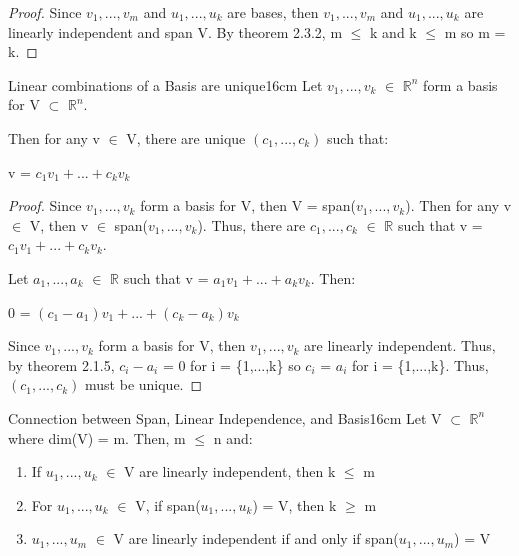     \begin{proof}
        Since $v_1,...,v_m$ and $u_1,...,u_k$ are bases,
        then $v_1,...,v_m$ and $u_1,...,u_k$ are linearly independent
        and span V.
        By {\color{red} theorem 2.3.2}, m $\leq$ k and k $\leq$ m
        so m = k.
    \end{proof}

    \vspace{0.5cm}



    \begin{wtheorem}{Linear combinations of a Basis are unique}{16cm}
        Let $v_1,...,v_k$ $\in$ $\mathbb{R}^n$ form a basis for
        V $\subset$ $\mathbb{R}^n$.
        
        Then for any v $\in$ V, there are unique $(c_1,...,c_k)$ such that:

        \hspace{0.5cm}
        v = $c_1v_1 + ... + c_kv_k$
    \end{wtheorem}

    \begin{proof}
        Since $v_1,...,v_k$ form a basis for V,
        then V = span($v_1,...,v_k$).
        Then for any v $\in$ V, then v $\in$ span($v_1,...,v_k$).
        Thus, there are $c_1,...,c_k$ $\in$ $\mathbb{R}$
        such that v = $c_1v_1 + ... + c_kv_k$.

        Let $a_1,...,a_k$ $\in$ $\mathbb{R}$ such that
        v = $a_1v_1 + ... + a_kv_k$. Then:

        \hspace{0.5cm}
        0 = $(c_1-a_1)v_1 + ... + (c_k-a_k)v_k$

        Since $v_1,...,v_k$ form a basis for V,
        then $v_1,...,v_k$ are linearly independent.
        Thus, by {\color{red} theorem 2.1.5}, $c_i - a_i$ = 0 for
        i = \{1,...,k\} so $c_i$ = $a_i$ for i = \{1,...,k\}.
        Thus, $(c_1,...,c_k)$ must be unique.
    \end{proof}

    \newpage



    \begin{wtheorem}{Connection between Span, Linear Independence, and Basis}{16cm}
        Let V $\subset$ $\mathbb{R}^n$ where dim(V) = m. Then, m $\leq$ n and:
    \end{wtheorem}

    \begin{enumerate}[label=(\alph*), leftmargin=2cm, itemsep=0.1cm]
        \item If $u_1,...,u_k$ $\in$ V are linearly independent,
            then k $\leq$ m

        \item For $u_1,...,u_k$ $\in$ V, if span($u_1,...,u_k$) = V,
            then k $\geq$ m

        \item $u_1,...,u_m$ $\in$ V are linearly independent if and only if
            span($u_1,...,u_m$) = V
    \end{enumerate}


